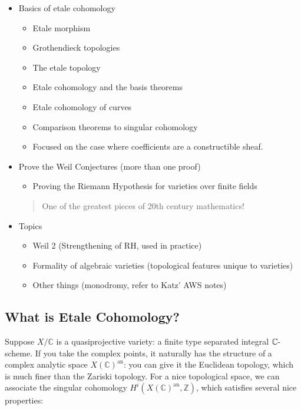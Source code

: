 \begin{itemize}
\tightlist
\item
  Basics of etale cohomology

  \begin{itemize}
  \tightlist
  \item
    Etale morphism
  \item
    Grothendieck topologies
  \item
    The etale topology
  \item
    Etale cohomology and the basis theorems
  \item
    Etale cohomology of curves
  \item
    Comparison theorems to singular cohomology
  \item
    Focused on the case where coefficients are a constructible sheaf.
  \end{itemize}
\item
  Prove the Weil Conjectures (more than one proof)

  \begin{itemize}
  \tightlist
  \item
    Proving the Riemann Hypothesis for varieties over finite fields
  \end{itemize}

  \begin{quote}
  One of the greatest pieces of 20th century mathematics!
  \end{quote}
\item
  Topics

  \begin{itemize}
  \tightlist
  \item
    Weil 2 (Strengthening of RH, used in practice)
  \item
    Formality of algebraic varieties (topological features unique to
    varieties)
  \item
    Other things (monodromy, refer to Katz' AWS notes)
  \end{itemize}
\end{itemize}

\hypertarget{what-is-etale-cohomology}{%
\subsection{What is Etale Cohomology?}\label{what-is-etale-cohomology}}

Suppose \(X/{\mathbb{C}}\) is a quasiprojective variety: a finite type
separated integral \({\mathbb{C}}{\hbox{-}}\)scheme. If you take the
complex points, it naturally has the structure of a complex analytic
space \(X({\mathbb{C}})^{\text{an}}\): you can give it the Euclidean
topology, which is much finer than the Zariski topology. For a nice
topological space, we can associate the singular cohomology
\(H^i(X({\mathbb{C}})^{\text{an}}, {\mathbb{Z}})\), which satisfies
several nice properties:

